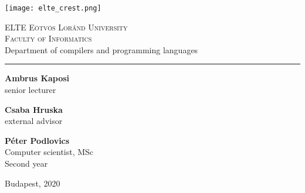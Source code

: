 \documentclass[main.tex]{subfiles}
\begin{document}
	\newcommand{\DEPARTMENT}[0]{Department of compilers and programming languages}
	
	\begin{titlepage}
		
		\begin{minipage}{0.3\linewidth}
			\texttt{[image: elte\_crest.png]}
		\end{minipage}
		\begin{minipage}{0.7\linewidth}
			\begin{center}
				\large
				\textsc{ELTE Eötvös Loránd University} \\
				\textsc{Faculty of Informatics} \\
				\DEPARTMENT
			\end{center}
		\end{minipage}
		\vspace{0.2cm}
		
		\hrule
		\vfill
		
		\begin{center}
			\Huge
			\makeatletter
			\textbf{\@title}
			\makeatother
			\normalsize
		\end{center}
		
		\vspace{5cm}
		
		\begin{minipage}{0.3\linewidth}
			\Large
			\textbf{Ambrus Kaposi} \\
			senior lecturer
			
			\vspace{1cm}
			
			\noindent
			\textbf{Csaba Hruska} \\
			external advisor
		\end{minipage}
		\hfill
		\begin{minipage}{0.36\linewidth}
			\Large
			\textbf{Péter Podlovics} \\
			Computer scientist, MSc \\
			Second year
		\end{minipage}
		
		\vfill
		
		\begin{center}
			\Large
			Budapest, 2020
		\end{center}
		
	\end{titlepage}
	
\end{document}

